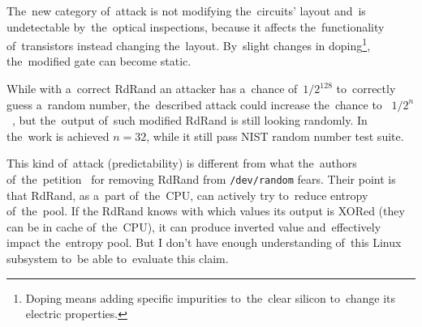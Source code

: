 \par{
The~new category of~attack is not modifying the~circuits' layout 
and~is undetectable by~the~optical inspections, because it affects the~functionality
 of~transistors instead changing the~layout. By~slight changes 
 in doping\footnote{Doping means adding specific impurities to~the~clear silicon 
 to~change its electric properties.}, the~modified gate can become static.
}

\par{
While with a~correct RdRand an attacker has a~chance of~$ 1/2^{128}$ to~correctly guess 
a~random number, the~described attack could increase the~chance to~
$ 1/2^n$~\cite[Chap. 3.2, page 9]{DopantAttack}, but the~output of~such
 modified RdRand is still looking randomly. In the~work is achieved  
 $n = 32$, while it still pass NIST random number test suite.
}

\par{
This kind of~attack (predictability) is different from what the~authors of~the~petition~\cite{PetitionRdRand} for removing RdRand from {\tt /dev/random} fears. Their point is that RdRand, as a~part of~the~CPU, can actively try to~reduce entropy of~the~pool. If the RdRand knows with which values its output is XORed (they can be in cache of~the~CPU), it can produce inverted value and~effectively impact the~entropy pool. But I don't have enough understanding of~this Linux subsystem to~be able to~evaluate this claim.
}
